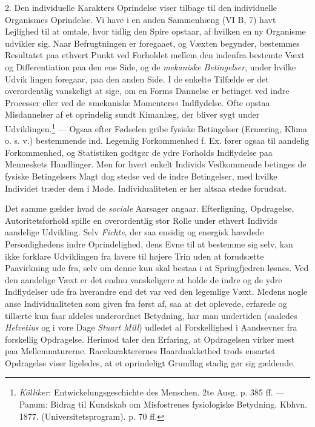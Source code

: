 \documentclass[12pt,a4paper,openany]{book}
\newcommand{\opage}[1]{\marginnote{\footnotesize\textit{[#1]}}}
\begin{document}
2. Den individuelle Karakters Oprindelse viser tilbage til den
individuelle Organismes Oprindelse. Vi have i en anden Sammenhæng (VI B,
7) havt Lejlighed til at omtale, hvor tidlig den Spire opstaar, af
hvilken en ny Organisme udvikler sig. Naar Befrugtningen er foregaaet,
og Væxten begynder, bestemmes Resultatet paa ethvert Punkt ved Forholdet
mellem den indenfra bestemte Væxt og Differentiation paa den ene Side,
og de \emph{mekaniske Betingelser}, under hvilke Udvik%
\opage{407}lingen foregaar, paa den anden Side. I de enkelte Tilfælde er
det overordentlig vanskeligt at sige, om en Forms Dannelse er betinget
ved indre Processer eller ved de »mekaniske Momenters« Indflydelse. Ofte
opstaa Misdannelser af et oprindelig sundt Kimanlæg, der bliver sygt
under Udviklingen.\footnote[1]{\emph{Kölliker}: Entwickelungsgeschichte
des Menschen. 2te Ausg. p. 385 ff. --- Panum: Bidrag til Kundskab om
Misfostrenes fysiologiske Betydning. Kbhvn. 1877. (Universitetsprogram).
p. 70 ff.} --- Ogsaa efter Fødselen gribe fysiske Betingelser (Ernæring,
Klima o. s. v.) bestemmende ind. Legemlig Forkommenhed f. Ex. fører
ogsaa til aandelig Forkommenhed, og Statistiken godtgør de ydre Forholds
Indflydelse paa Menneskets Handlinger. Men for hvert enkelt Individs
Vedkommende betinges de fysiske Betingelsers Magt dog stedse ved de
indre Betingelser, med hvilke Individet træder dem i Møde.
Individualiteten er her altsaa stedse forudsat.

Det samme gælder hvad de \emph{sociale} Aarsager angaar. Efterligning,
Opdragelse, Autoritetsforhold spille en overordentlig stor Rolle under
ethvert Individs aandelige Udvikling. Selv \emph{Fichte}, der saa
ensidig og energisk hævdede Personlighedens indre Oprindelighed, dens
Evne til at bestemme sig selv, kan ikke forklare Udviklingen fra lavere
til højere Trin uden at forudsætte Paavirkning ude fra, selv om denne
kun skal bestaa i at Springfjedren løsnes. Ved den aandelige Væxt er det
endnu vanskeligere at holde de indre og de ydre Indflydelser ude fra
hverandre end det var ved den legemlige Væxt. Medens nogle anse
Individualiteten som given fra først af, saa at det oplevede, erfarede
og tillærte kun faar aldeles underordnet Betydning, har man undertiden
(saaledes \emph{Helvetius} og i vore Dage \emph{Stuart Mill}) udledet al
Forskellighed i Aandsevner fra forskellig Opdragelse. Herimod taler den
Erfaring, at Opdragelsen virker mest paa Mellemnaturerne.
Racekarakterernes Haardnakkethed trods ensartet Opdragelse viser
ligeledes, at et oprindeligt Grundlag stadig gør sig gældende.
\end{document}
